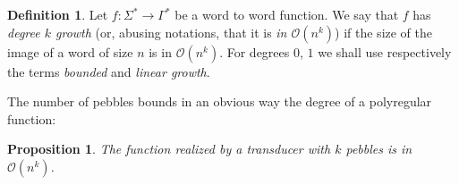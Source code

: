\documentclass{article}
\newcommand{\atuple}[1]{\left\langle #1 \right\rangle}
\newcommand{\Tt}{\mathcal T}
\newcommand{\Oo}{\mathcal O}
\newtheorem{proposition}[theorem]{Proposition}
\theoremstyle{definition}
\newtheorem{definition}[theorem]{Definition}
\theoremstyle{remark}
\begin{document}
\begin{definition}
  Let $f:\Sigma^*\to \Gamma^*$ be a word to word function.
  We say that $f$ has \emph{degree $k$ growth} (or, abusing notations, that it is \emph{in $\Oo(n^k)$}) if the size of the image of a word of size $n$ is in $\Oo(n^k)$.
  For degrees $0$, $1$ we shall use respectively the terms \emph{bounded} and \emph{linear growth}.
  
\end{definition}


The number of pebbles bounds in an obvious way the degree of a polyregular function:
\begin{proposition}
  \label{prop:degree}
The function realized by a transducer with $k$ pebbles is in $\Oo(n^k)$.
\end{proposition}

\begin{comment}
\begin{proof}
The proof is done by induction on $k$. A $1$-pebble transducer is linear. Let us assume that $k$-pebble transducers are of growth degree $k$. Let  $\Tt=\atuple{T_1,\ldots,T_{k+1}}$ be a $k+1$-pebble transducer. Then $T_{k+1}$ is linear in the number of calls to $\Tt_k$, which means that $\Tt$ is in $\Oo(n\cdot n^k)=\Oo(n^k)$.
\end{proof}
\end{comment}
\end{document}
